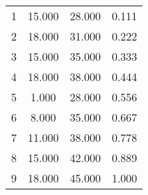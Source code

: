 % 
\begin{tabular}{cccc}
  \hline
  \hline
1 & 15.000 & 28.000 & 0.111 \\ 
  2 & 18.000 & 31.000 & 0.222 \\ 
  3 & 15.000 & 35.000 & 0.333 \\ 
  4 & 18.000 & 38.000 & 0.444 \\ 
  5 & 1.000 & 28.000 & 0.556 \\ 
  6 & 8.000 & 35.000 & 0.667 \\ 
  7 & 11.000 & 38.000 & 0.778 \\ 
  8 & 15.000 & 42.000 & 0.889 \\ 
  9 & 18.000 & 45.000 & 1.000 \\ 
   \hline
\end{tabular}
